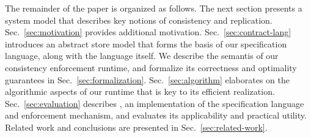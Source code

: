 The remainder of the paper is organized as follows.  The next section
presents a system model that describes key notions of consistency and
replication.  Sec.~\ref{sec:motivation} provides additional
motivation.  Sec.~\ref{sec:contract-lang} introduces an abstract store
model that forms the basis of our specification language, along with
the language itself. We describe the semantis of our consistency
enforcement runtime, and formalize its correctness and optimality
guarantees in Sec.~\ref{sec:formalization}.  Sec.~\ref{sec:algorithm}
elaborates on the algorithmic aspects of our runtime that is key to
its efficient realization.  Sec.~\ref{sec:evaluation} describes \tool,
an implementation of the specification language and enforcement
mechanism, and evaluates its applicability and practical utility.
Related work and conclusions are presented in
Sec.~\ref{sec:related-work}.


